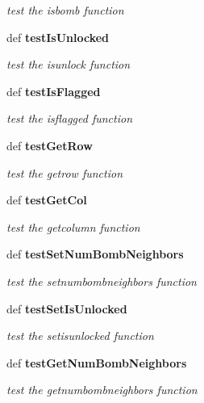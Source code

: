 \begin{CompactItemize}
\begin{CompactList}\small\item\em test the isbomb function \item\end{CompactList}\item 
def \bf{test\-Is\-Unlocked}\label{classtestall_1_1CellTest_021f775331272d7a7ab159c84b770e97}

\begin{CompactList}\small\item\em test the isunlock function \item\end{CompactList}\item 
def \bf{test\-Is\-Flagged}\label{classtestall_1_1CellTest_cf97ae29be657e9b6483474444ed727b}

\begin{CompactList}\small\item\em test the isflagged function \item\end{CompactList}\item 
def \bf{test\-Get\-Row}\label{classtestall_1_1CellTest_3abde3896ecadcd3e1b39bf6db2047e1}

\begin{CompactList}\small\item\em test the getrow function \item\end{CompactList}\item 
def \bf{test\-Get\-Col}\label{classtestall_1_1CellTest_7cfbee771520fcdd43324648ff73220e}

\begin{CompactList}\small\item\em test the getcolumn function \item\end{CompactList}\item 
def \bf{test\-Set\-Num\-Bomb\-Neighbors}\label{classtestall_1_1CellTest_e1779da2a3ed9b508c3d8cc2653951ae}

\begin{CompactList}\small\item\em test the setnumbombneighbors function \item\end{CompactList}\item 
def \bf{test\-Set\-Is\-Unlocked}\label{classtestall_1_1CellTest_858067d79acc6c11da13fcbd323d72f4}

\begin{CompactList}\small\item\em test the setisunlocked function \item\end{CompactList}\item 
def \bf{test\-Get\-Num\-Bomb\-Neighbors}\label{classtestall_1_1CellTest_4fc4d114d2e036c4551d9bbc8fec0680}

\begin{CompactList}\small\item\em test the getnumbombneighbors function \item\end{CompactList}\end{CompactItemize}
